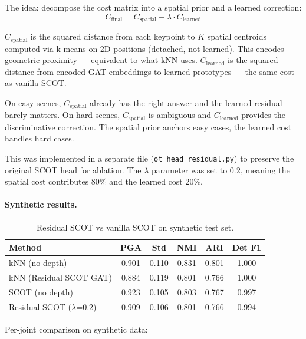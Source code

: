 The idea: decompose the cost matrix into a spatial prior and a learned correction:
\[
C_{\text{final}} = C_{\text{spatial}} + \lambda \cdot C_{\text{learned}}
\]

$C_{\text{spatial}}$ is the squared distance from each keypoint to $K$ spatial centroids computed via k-means on 2D positions (detached, not learned). This encodes geometric proximity --- equivalent to what kNN uses. $C_{\text{learned}}$ is the squared distance from encoded GAT embeddings to learned prototypes --- the same cost as vanilla SCOT.

On easy scenes, $C_{\text{spatial}}$ already has the right answer and the learned residual barely matters. On hard scenes, $C_{\text{spatial}}$ is ambiguous and $C_{\text{learned}}$ provides the discriminative correction. The spatial prior anchors easy cases, the learned cost handles hard cases.

This was implemented in a separate file (\texttt{ot\_head\_residual.py}) to preserve the original SCOT head for ablation. The $\lambda$ parameter was set to 0.2, meaning the spatial cost contributes 80\% and the learned cost 20\%.

\paragraph{Synthetic results.}

\begin{table}[H]
\centering
\footnotesize
\begin{tabular}{lccccc}
\toprule
Method & PGA & Std & NMI & ARI & Det F1 \\
\midrule
kNN (no depth) & 0.901 & 0.110 & 0.831 & 0.801 & 1.000 \\
kNN (Residual SCOT GAT) & 0.884 & 0.119 & 0.801 & 0.766 & 1.000 \\
SCOT (no depth) & 0.923 & 0.105 & 0.803 & 0.767 & 0.997 \\
Residual SCOT ($\lambda$=0.2) & 0.909 & 0.106 & 0.801 & 0.766 & 0.994 \\
\bottomrule
\end{tabular}
\caption{Residual SCOT vs vanilla SCOT on synthetic test set.}
\end{table}

Per-joint comparison on synthetic data:

